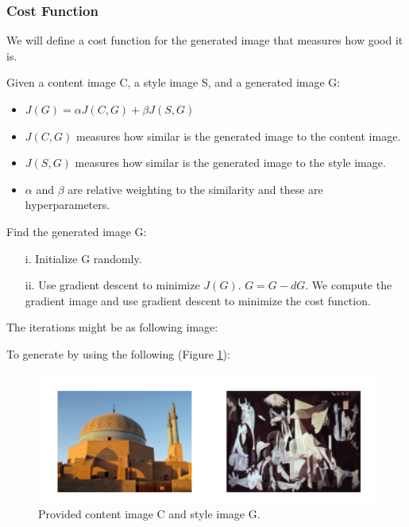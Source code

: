 
\subsubsection{Cost Function}
We will define a cost function for the generated image that measures how good it is.

Given a content image C, a style image S, and a generated image G:
\begin{itemize}
    \item $J(G) = \alpha J(C, G) + \beta J(S, G)$
    \item $J(C, G)$ measures how similar is the generated image to the content image.
    \item $J(S, G)$ measures how similar is the generated image to the style image.
    \item $\alpha$ and $\beta$ are relative weighting to the similarity and these are hyperparameters.
\end{itemize}

Find the generated image G:

\begin{itemize}
    \item[i.] Initialize G randomly.
    \item[ii.] Use gradient descent to minimize $J(G)$. $G = G - dG$. We compute the gradient image and use gradient descent to minimize the cost function.
\end{itemize}

The iterations might be as following image:

To generate by using the following (Figure \ref{cgimage}):

\begin{figure}[!htbp]
    \centering
    \includegraphics[width=1.0\textwidth]{img/c4/cgimage.png}
    \caption{Provided content image C and style image G.}
    \label{cgimage}  
\end{figure}  

